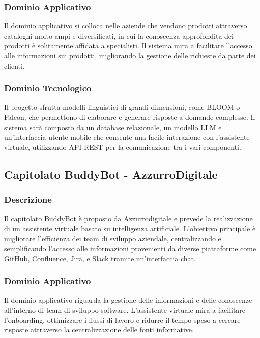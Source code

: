 \documentclass{article}
\begin{document}
\subsubsection{Dominio Applicativo}
Il dominio applicativo si colloca nelle aziende che vendono prodotti attraverso 
cataloghi molto ampi e diversificati, in cui la conoscenza approfondita dei prodotti è 
solitamente affidata a specialisti. Il sistema mira a facilitare l'accesso alle informazioni sui prodotti, 
migliorando la gestione delle richieste da parte dei clienti.

\subsubsection{Dominio Tecnologico}
Il progetto sfrutta modelli linguistici di grandi dimensioni, 
come BLOOM o Falcon, che permettono di elaborare e generare risposte a domande complesse. 
Il sistema sarà composto da un database relazionale, un modello LLM e un’interfaccia 
utente mobile che consente una facile interazione con l'assistente virtuale, 
utilizzando API REST per la comunicazione tra i vari componenti.

\subsection{Capitolato BuddyBot - AzzurroDigitale}

\subsubsection{Descrizione}
Il capitolato BuddyBot è proposto da Azzurrodigitale e prevede la realizzazione 
di un assistente virtuale basato su intelligenza artificiale. 
L'obiettivo principale è migliorare l'efficienza dei team di sviluppo aziendale, 
centralizzando e semplificando l'accesso alle informazioni provenienti da diverse piattaforme come GitHub, 
Confluence, Jira, e Slack tramite un'interfaccia chat.

\subsubsection{Dominio Applicativo}
Il dominio applicativo riguarda la gestione delle informazioni e 
delle conoscenze all'interno di team di sviluppo software. 
L'assistente virtuale mira a facilitare l'onboarding, ottimizzare i flussi di lavoro e ridurre 
il tempo speso a cercare risposte attraverso la centralizzazione delle fonti informative.
\end{document}
